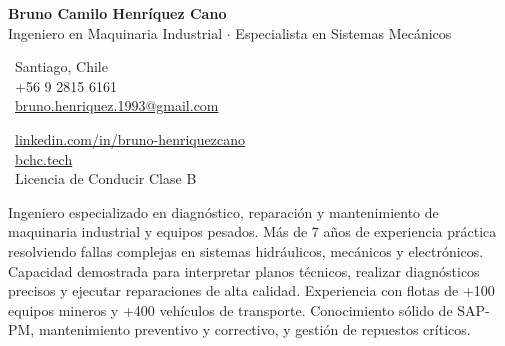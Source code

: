 \documentclass[10pt,letterpaper]{article}
\begin{document}
\begin{center}
    {\Huge \textbf{Bruno Camilo Henríquez Cano}} \\[0.2cm]
    {\Large Ingeniero en Maquinaria Industrial $\cdot$ Especialista en Sistemas Mecánicos}
\end{center}

\vspace{0.3cm}

\noindent
\begin{minipage}[t]{0.5\textwidth}
    \faMapMarker\ Santiago, Chile \\
    \faPhone\ +56 9 2815 6161 \\
    \faEnvelope\ \href{mailto:bruno.henriquez.1993@gmail.com}{bruno.henriquez.1993@gmail.com}
\end{minipage}
\begin{minipage}[t]{0.5\textwidth}
    \faLinkedin\ \href{https://linkedin.com/in/bruno-henriquezcano}{linkedin.com/in/bruno-henriquezcano} \\
    \faGlobe\ \href{https://bchc.tech}{bchc.tech} \\
    \faCar\ Licencia de Conducir Clase B
\end{minipage}

\vspace{0.4cm}


\vspace{0.2cm}

\noindent Ingeniero especializado en diagnóstico, reparación y mantenimiento de maquinaria industrial y equipos pesados. Más de 7 años de experiencia práctica resolviendo fallas complejas en sistemas hidráulicos, mecánicos y electrónicos. Capacidad demostrada para interpretar planos técnicos, realizar diagnósticos precisos y ejecutar reparaciones de alta calidad. Experiencia con flotas de +100 equipos mineros y +400 vehículos de transporte. Conocimiento sólido de SAP-PM, mantenimiento preventivo y correctivo, y gestión de repuestos críticos.

\vspace{0.4cm}


\vspace{0.3cm}
\end{document}
